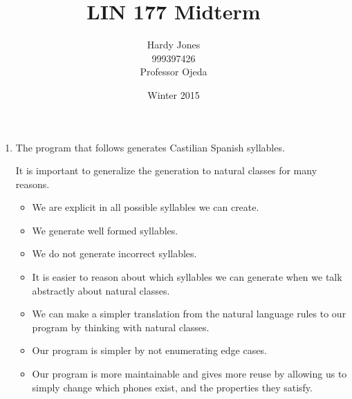 \documentclass[12pt,letterpaper]{article}
\title{LIN 177 Midterm\vspace{-2ex}}
\author{Hardy Jones\\
        999397426\\
        Professor Ojeda\vspace{-2ex}}
\date{Winter 2015}
\begin{document}
  \maketitle


  \begin{enumerate}
    \item
      The program that follows generates Castilian Spanish syllables.

      It is important to generalize the generation to natural classes for many reasons.
      \begin{itemize}
        \item We are explicit in all possible syllables we can create.
        \item We generate well formed syllables.
        \item We do not generate incorrect syllables.
        \item It is easier to reason about which syllables we can generate when we talk abstractly about natural classes.
        \item We can make a simpler translation from the natural language rules to our program by thinking with natural classes.
        \item Our program is simpler by not enumerating edge cases.
        \item Our program is more maintainable and gives more reuse by allowing us to simply change which phones exist, and the properties they satisfy.
      \end{itemize}

  \end{enumerate}
\end{document}
